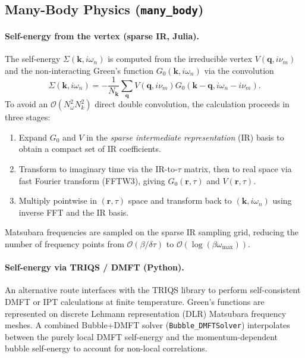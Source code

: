 \subsection{Many-Body Physics (\texttt{many\_body})}

\paragraph{Self-energy from the vertex (sparse IR, Julia).}
\label{sec:se_sparse_ir}
The self-energy $\Sigma(\mathbf{k}, i\omega_n)$ is computed from the irreducible
vertex $V(\mathbf{q}, i\nu_m)$ and the non-interacting Green's function
$G_0(\mathbf{k}, i\omega_n)$ via the convolution
\[
    \Sigma(\mathbf{k}, i\omega_n) =
    -\frac{1}{N_\mathbf{k}}\sum_{\mathbf{q}} V(\mathbf{q},i\nu_m)
    G_0(\mathbf{k}-\mathbf{q}, i\omega_n - i\nu_m).
\]
To avoid an $\mathcal{O}(N_\omega^2 N_k^2)$ direct double convolution, the
calculation proceeds in three stages:
\begin{enumerate}
    \item Expand $G_0$ and $V$ in the \emph{sparse intermediate representation}
        (IR) basis to obtain a compact set of IR coefficients.
    \item Transform to imaginary time via the IR-to-$\tau$ matrix, then to real
        space via fast Fourier transform (FFTW3), giving $G_0(\mathbf{r},\tau)$
        and $V(\mathbf{r},\tau)$.
    \item Multiply pointwise in $(\mathbf{r},\tau)$ space and transform back to
        $(\mathbf{k}, i\omega_n)$ using inverse FFT and the IR basis.
\end{enumerate}
Matsubara frequencies are sampled on the sparse IR sampling grid, reducing the
number of frequency points from $\mathcal{O}(\beta/\delta\tau)$ to
$\mathcal{O}(\log(\beta\omega_\mathrm{max}))$.

\paragraph{Self-energy via TRIQS / DMFT (Python).}
An alternative route interfaces with the TRIQS library to perform self-consistent
DMFT or IPT calculations at finite temperature.  Green's functions are represented
on discrete Lehmann representation (DLR) Matsubara frequency meshes.  A combined
Bubble+DMFT solver (\texttt{Bubble\_DMFTSolver}) interpolates between the
purely local DMFT self-energy and the momentum-dependent bubble self-energy to
account for non-local correlations.

